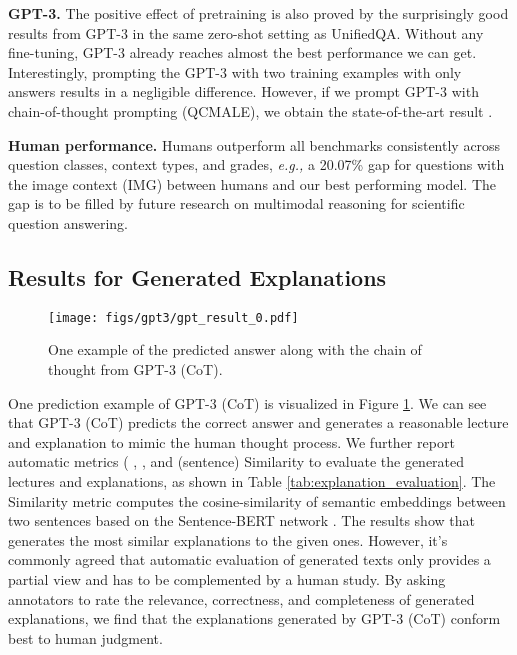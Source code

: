 \textbf{GPT-3.} The positive effect of pretraining is also proved by the surprisingly good results from GPT-3 in the same zero-shot setting as UnifiedQA. Without any fine-tuning, GPT-3 already reaches almost the best performance we can get. Interestingly, prompting the GPT-3 with two training examples with only answers results in a negligible difference. However, if we prompt GPT-3 with chain-of-thought prompting (QCMALE), we obtain the state-of-the-art result .

\textbf{Human performance.} Humans outperform all benchmarks consistently across question classes, context types, and grades, \textit{e.g.,} a 20.07\% gap for questions with the image context (IMG) between humans and our best performing model. The gap is to be filled by future research on multimodal reasoning for scientific question answering.
 
 
\subsection{Results for Generated Explanations}

\begin{figure}[t!]
 \centering
\texttt{[image: figs/gpt3/gpt\_result\_0.pdf]}
 \caption{One example of the predicted answer along with the chain of thought from GPT-3 (CoT).}
 \label{fig:gpt3_result}
\end{figure}

One prediction example of GPT-3 (CoT) is visualized in Figure \ref{fig:gpt3_result}. We can see that GPT-3 (CoT) predicts the correct answer and generates a reasonable lecture and explanation to mimic the human thought process.
We further report automatic metrics ( \cite{papineni2002bleu},  \cite{papineni2002bleu}, and (sentence) Similarity \cite{reimers-2019-sentence-bert} to evaluate the generated lectures and explanations, as shown in Table \ref{tab:explanation_evaluation}. The  Similarity metric computes the cosine-similarity of semantic embeddings  between two sentences based on the Sentence-BERT network \cite{reimers-2019-sentence-bert}.
The results show that  generates the most similar explanations to the given ones. However, it's commonly agreed that automatic evaluation of generated texts only provides a partial view and has to be complemented by a human study. By asking annotators to rate the relevance, correctness, and completeness of generated explanations, we find that the explanations generated by GPT-3 (CoT) conform best to human judgment.




